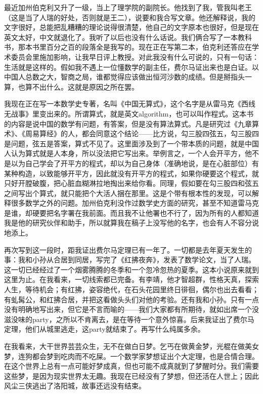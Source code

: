 最近加州伯克利又升了一级，当上了理学院的副院长。他找到了我，管我叫老王（这是当了人瑞的好处，否则就是王二），说要和我合写文章。他还解释说，我的文字很好，总能把乱糟糟的理论说得很清楚，他自己的文字原本也很好，但是现在英文太好，中文就退化了。我听了以后也没有什么话说。我们俩合写了一本教科书，那本书里百分之百的段落全是我写的。现在正在写第二本，伯克利还答应在学术委员会里施加影响，让我早日评上教授。对此我没有什么可说的，只有一句话：生活就是这样的。假如我不遇上一位懂数学的副主任，费尔马证出来也是白证。以中国人总数之大，智商之局，谁都觉得应该做出恒河沙数的成绩。但是掰指头一算，也算不出什么。这就是原因之所在罢。 

我现在正在写一本数学史专著，名叫《中国无算式》，这个名字是从雷马克《西线无战事》里变出来的。所谓算式，就是英文algorithm，也可以叫作程式。这本书的内容是说中国的数学有问题，有答案，但是没有算法算式。凡是研究过《九章算术》、《周易算经》的人，都会同意这个结论——比方说，勾三股四弦五，勾三股四是问题，弦五是答案，算式不见了。这里面涉及到了一个带本质的问题，就是中国人认为算式就是人本身，所以没法把它写出来。举例言之，一个人会开平方，他不是以为自己学会了开平方的程式，却以为自己身体（准确地说，是在心脏部位）有某种构造，以致能够开平方，因此就没有开平方的程式，如果你硬要这个程式，就只好开膛破腹，把心脏血糊淋拉地掏出来给你看。同理，假如要在勾三股四和弦五之间写出个算式，就只能把个大活人捆在那里。这是个带有根本性的发现，可以解释很多数学之外的问题。加州伯克利没作过数学史方面的研究，甚至不知道雷马克是谁，却硬要把名字署在我前面。而且我不让他署也不行了，因为所有的人都知道我是他的研究伙伴和助手，所以就算我在稿子上没写他的名字，也会有人不容分说地添上。 

再次写到这一段时，距我证出费尔马定理已有一年了。一切都是去年夏天发生的事：我和小孙从合居到同居，写完了《红拂夜奔》，发表了数学论文，当了人瑞。这一切已经经过了一个烟雾腾腾的冬季和一个忽冷忽热的夏季。这本小说原来就到这里为止。在我看来，一切线索都已完备。有李靖，他才智超群，性格天真，探索人生，等待机会；有红拂，姿容绝代，在石头花园里终日徘徊，偶尔也出去看看；有虬髯公，和红拂合居，并把这看做头头们对他的考验。还有我和小孙。只有一点没有明确地写出来，但它是不言而喻的——我们大家都有所期待，就如出席一个没滋没味的party，之所以不肯离去，是在等待一个意外惊喜。后来我证出了费尔马定理，他们从城里逃走，这party就结束了。再写什么纯属多余。 

在我看来，大干世界芸芸众生，无不在做白日梦。乞丐在做黄金梦，光棍在做美女梦，连狗都会梦到吃肉而不吃屎。一个数学家梦想证出个大定理，也是合情合理。在这个世界上总有一点可能好梦成真，但也可能不成真就到了梦醒时分。我们需要这些梦，是因为现实世界太无趣。我现在已经没有了梦想，但还活在人世上；因此风尘三侠逃出了洛阳城，故事还远没有结束。

